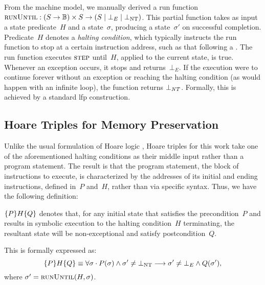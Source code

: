 From the machine model, we manually derived a run function%
$\operatorname{\textsc{runUntil}}:(S\rightarrow\mathbb{B})\times S\rightarrow(S\mid\bot_E\mid\bot_\mathrm{NT})$.
This partial function takes as input a state predicate~$H$ and a state~$\sigma$,%
producing a state~$\sigma'$ on successful completion.
Predicate~$H$ denotes a \emph{halting condition},%
which typically instructs the run function to stop
at a certain instruction address, such as that following a .
The run function executes $\operatorname{\textsc{step}}$ until~$H$, applied to the current state,
is true. Whenever an exception occurs, it stops and returns~$\bot_E$.
If the execution were to continue forever
without an exception or reaching the halting condition
(as would happen with an infinite loop), the function returns $\bot_{\mathit{NT}}$.
Formally, this is achieved by a standard \ac{lfp} construction.

\subsection{Hoare Triples for Memory Preservation}
Unlike the usual formulation of
Hoare logic \autocite{hoare1969axiomatic,myreen2007hoare},%
Hoare triples for this work take one of the aforementioned halting conditions%
as their middle input rather than a program statement.
The result is that the program statement,
the block of instructions to execute, is characterized by the addresses of its initial
and ending instructions, defined in~$P$ and~$H$, rather than via specific syntax.
Thus, we have the following definition:
\begin{definition}\label{def:htriple}
  $\{P\}H\{Q\}$
  denotes that, for any initial state that satisfies the precondition~$P$
  and results in symbolic execution to the halting condition~$H$ terminating,
  the resultant state will be non-exceptional and satisfy postcondition~$Q$.

  This is formally expressed as:
  \begin{equation}
  \{P\}H\{Q\}\equiv\forall\sigma\cdot
  P(\sigma)\wedge\sigma'\neq\bot_\mathrm{NT}\longrightarrow
  \sigma'\neq\bot_E\wedge Q(\sigma'),
  \end{equation}
  where $\sigma'=\operatorname{\textsc{runUntil}}(H,\sigma)$.
\end{definition}

